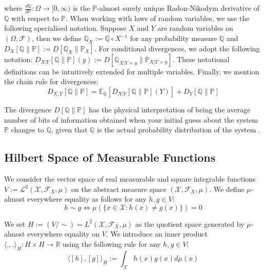 \documentclass{article}
\begin{document}
where $\frac{d \mathbb{Q}}{d \mathbb{P}} : \Omega \rightarrow [0 ,\infty)$ is the $\mathbb{P}$-almost surely unique Radon-Nikodym derivative of $\mathbb{Q}$ with respect to $\mathbb{P}$. When working with laws of random variables, we use the following specialised notation. Suppose $X$ and $Y$ are random variables on $(\Omega , \mathcal{F})$, then we define $\mathbb{Q}_X := \mathbb{Q} \circ X^{- 1}$ for any probability measure $\mathbb{Q}$ and $D_X [\mathbb{Q}\|\mathbb{P}] := D[\mathbb{Q}_X\|\mathbb{P}_X]$. For conditional divergences, we adopt the following notation: $D_{X | Y}[\mathbb{Q}\|\mathbb{P}](y) := D[\mathbb{Q}_{X | Y = y}\|\mathbb{P}_{X | Y = y}]$. These notational definitions can be intuitively extended for multiple variables. Finally, we mention the chain rule for divergences:
\begin{equation}
D_{X , Y}[\mathbb{Q}\|\mathbb{P}] = \mathbb{E}_{\mathbb{Q}}[D_{X | Y}[\mathbb{Q}\|\mathbb{P}](Y)] + D_Y[\mathbb{Q}\|\mathbb{P}]
\end{equation}

The divergence $D[\mathbb{Q}\|\mathbb{P}]$ has the physical interpretation of being the average number of bits of information obtained when your initial guess about the system $\mathbb{P}$ changes to $\mathbb{Q}$, given that $\mathbb{Q}$ is the actual probability distribution of the system \cite[Section 5.4]{mackay2003information}.

\subsection{Hilbert Space of Measurable Functions} \label{measurable-functions-hilbert-space}

We consider the vector space of real measurable and square integrable functions $V := \mathcal{L}^2(\mathcal{X} , \mathcal{F}_X , \mu)$ on the abstract measure space $(\mathcal{X} , \mathcal{F}_X , \mu)$. We define $\mu$-almost everywhere equality as follows for any $h , g \in V$:
\begin{equation}
h \sim g \Leftrightarrow \mu(\{x \in \mathcal{X} : h(x) \neq g(x)\}) = 0
\end{equation}

We set $H := (V / \sim) = L^2(\mathcal{X} , \mathcal{F}_X , \mu)$ as the quotient space generated by $\mu$-almost everywhere equality on $V$. We introduce an inner product $\langle . , . \rangle_H : H \times H \rightarrow \mathbb{R}$ using the following rule for any $h , g \in V$:
\begin{equation} \label{random-variable-hilbert-space-inner-product}
\langle [h], [g] \rangle_H := \int_{\mathcal{X}} h(x) g(x) d \mu(x)
\end{equation}
\end{document}
